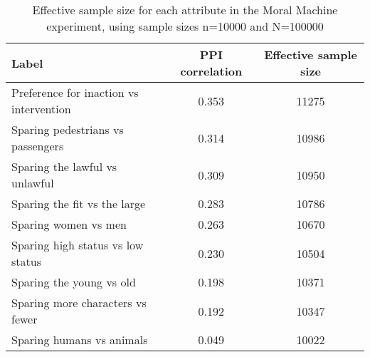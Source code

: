\begin{table}
\caption{Effective sample size for each attribute in the Moral Machine experiment, using sample sizes n=10000 and N=100000}
\label{tab:n0MME}
\begin{tabular}{lcc}
\toprule
Label & PPI correlation & Effective sample size \\
\midrule
Preference for inaction vs intervention & 0.353 & 11275 \\
Sparing pedestrians vs passengers & 0.314 & 10986 \\
Sparing the lawful vs unlawful & 0.309 & 10950 \\
Sparing the fit vs the large & 0.283 & 10786 \\
Sparing women vs men & 0.263 & 10670 \\
Sparing high status vs low status & 0.230 & 10504 \\
Sparing the young vs old & 0.198 & 10371 \\
Sparing more characters vs fewer & 0.192 & 10347 \\
Sparing humans vs animals & 0.049 & 10022 \\
\bottomrule
\end{tabular}
\end{table}
